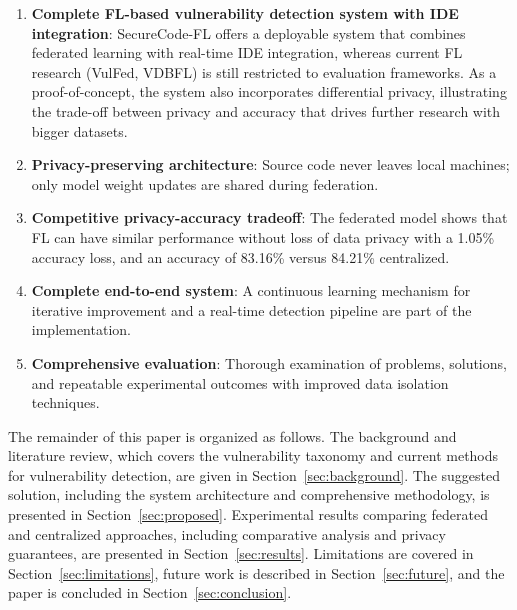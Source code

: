 \documentclass[pdflatex,sn-mathphys-num]{sn-jnl}
\theoremstyle{thmstyleone}%
\theoremstyle{thmstyletwo}%
\theoremstyle{thmstylethree}%
\begin{document}
\begin{enumerate}
    \item \textbf{Complete FL-based vulnerability detection system with IDE integration}: SecureCode-FL offers a deployable system that combines federated learning with real-time IDE integration, whereas current FL research (VulFed, VDBFL) is still restricted to evaluation frameworks. As a proof-of-concept, the system also incorporates differential privacy, illustrating the trade-off between privacy and accuracy that drives further research with bigger datasets.
    
    \item \textbf{Privacy-preserving architecture}: Source code never leaves local machines; only model weight updates are shared during federation.
    
    \item \textbf{Competitive privacy-accuracy tradeoff}: The federated model shows that FL can have similar performance without loss of data privacy with a 1.05\% accuracy loss, and an accuracy of 83.16\% versus 84.21\% centralized.
    
    \item \textbf{Complete end-to-end system}: A continuous learning mechanism for iterative improvement and a real-time detection pipeline are part of the implementation.
    
    \item \textbf{Comprehensive evaluation}: Thorough examination of problems, solutions, and repeatable experimental outcomes with improved data isolation techniques.
\end{enumerate}

The remainder of this paper is organized as follows. The background and literature review, which covers the vulnerability taxonomy and current methods for vulnerability detection, are given in Section~\ref{sec:background}. The suggested solution, including the system architecture and comprehensive methodology, is presented in Section~\ref{sec:proposed}. Experimental results comparing federated and centralized approaches, including comparative analysis and privacy guarantees, are presented in Section~\ref{sec:results}. Limitations are covered in Section~\ref{sec:limitations}, future work is described in Section~\ref{sec:future}, and the paper is concluded in Section~\ref{sec:conclusion}.

\end{document}
